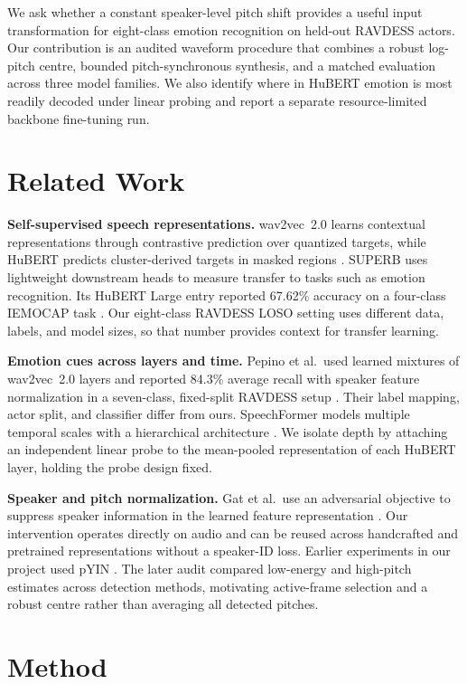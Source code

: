 \documentclass[11pt, letterpaper]{article}
\begin{document}
We ask whether a constant speaker-level pitch shift provides a useful input transformation for eight-class emotion recognition on held-out RAVDESS actors. Our contribution is an audited waveform procedure that combines a robust log-pitch centre, bounded pitch-synchronous synthesis, and a matched evaluation across three model families. We also identify where in HuBERT emotion is most readily decoded under linear probing and report a separate resource-limited backbone fine-tuning run.

\clearpage
\section{Related Work}
\textbf{Self-supervised speech representations.}
wav2vec~2.0 learns contextual representations through contrastive prediction over quantized targets, while HuBERT predicts cluster-derived targets in masked regions \cite{wav2vec,hubert}. SUPERB uses lightweight downstream heads to measure transfer to tasks such as emotion recognition. Its HuBERT Large entry reported 67.62\% accuracy on a four-class IEMOCAP task \cite{superb}. Our eight-class RAVDESS LOSO setting uses different data, labels, and model sizes, so that number provides context for transfer learning.

\textbf{Emotion cues across layers and time.}
Pepino et al.\ used learned mixtures of wav2vec~2.0 layers and reported 84.3\% average recall with speaker feature normalization in a seven-class, fixed-split RAVDESS setup \cite{pepino}. Their label mapping, actor split, and classifier differ from ours. SpeechFormer models multiple temporal scales with a hierarchical architecture \cite{speechformer}. We isolate depth by attaching an independent linear probe to the mean-pooled representation of each HuBERT layer, holding the probe design fixed.

\textbf{Speaker and pitch normalization.}
Gat et al.\ use an adversarial objective to suppress speaker information in the learned feature representation \cite{gat}. Our intervention operates directly on audio and can be reused across handcrafted and pretrained representations without a speaker-ID loss. Earlier experiments in our project used pYIN \cite{pyin}. The later audit compared low-energy and high-pitch estimates across detection methods, motivating active-frame selection and a robust centre rather than averaging all detected pitches.

\section{Method}
\end{document}
